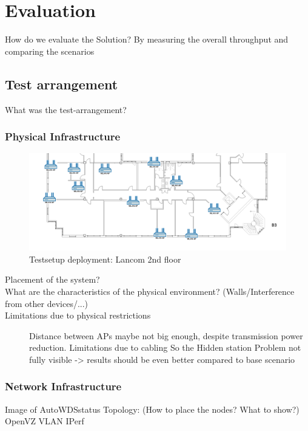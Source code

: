 \chapter{Evaluation}
How do we evaluate the Solution?\newline
  By measuring the overall throughput and comparing the scenarios\newline
\section{Test arrangement}
What was the test-arrangement? \newline
  \subsection{Physical Infrastructure}
    \begin{figure}[t]
      \centering
      \includegraphics[width=1\columnwidth]{figures/Lancom-flur-withaps}
      \caption{Testsetup deployment: Lancom 2nd floor}
      \label{fig:2ndfloor}
    \end{figure}
    \begin{description}
     \item[Placement of the system?]
     \item[What are the characteristics of the physical environment? (Walls/Interference from other devices/...)]
     \item[Limitations due to physical restrictions]
      Distance between APs maybe not big enough, despite transmission power reduction. Limitations due to cabling\newline
      So the Hidden station Problem not fully visible -> results should be even better compared to base scenario \newline
    \end{description}
  \subsection{Network Infrastructure}
    Image of AutoWDSstatus Topology: (How to place the nodes? What to show?)
    OpenVZ \newline
    VLAN \newline
    IPerf \newline
